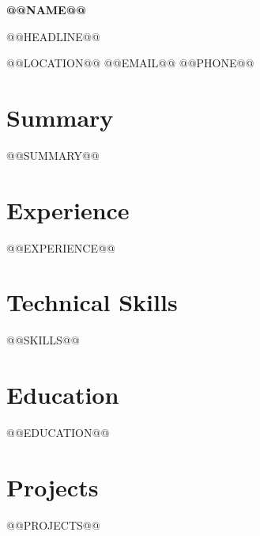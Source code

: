 \documentclass[10pt,a4paper]{article}
\begin{document}

\begin{center}
{\fontsize{18}{20}\selectfont\textbf{@@NAME@@}}

\vspace{2pt}

@@HEADLINE@@

\vspace{3pt}

@@LOCATION@@ \quad
@@EMAIL@@ \quad
@@PHONE@@
\end{center}


\section*{Summary}

@@SUMMARY@@


\section*{Experience}

@@EXPERIENCE@@


\section*{Technical Skills}

@@SKILLS@@


\section*{Education}

@@EDUCATION@@


\section*{Projects}

@@PROJECTS@@
\end{document}
